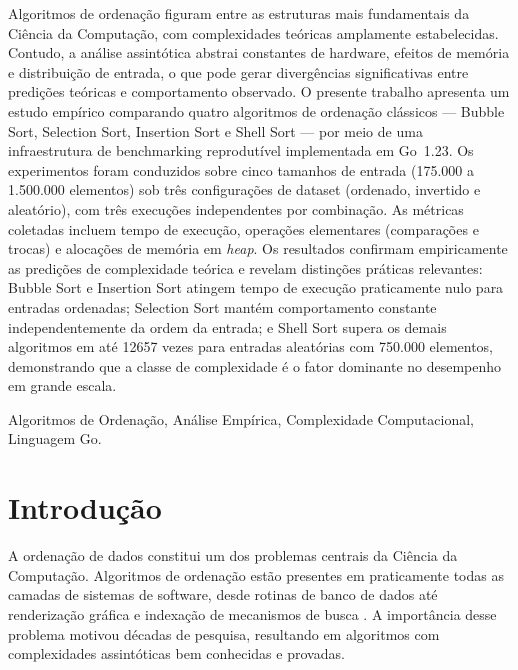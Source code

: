 \documentclass[12pt]{article}
\newcommand{\num}[1]{#1}
\begin{document}
\begin{resumo}
Algoritmos de ordenação figuram entre as estruturas mais
fundamentais da Ciência da Computação, com complexidades teóricas
amplamente estabelecidas. Contudo, a análise assintótica abstrai
constantes de hardware, efeitos de memória e distribuição de
entrada, o que pode gerar divergências significativas entre
predições teóricas e comportamento observado. O presente trabalho
apresenta um estudo empírico comparando quatro algoritmos de
ordenação clássicos — Bubble Sort, Selection Sort, Insertion Sort
e Shell Sort — por meio de uma infraestrutura de benchmarking
reprodutível implementada em Go~1.23. Os experimentos foram
conduzidos sobre cinco tamanhos de entrada (175.000 a 1.500.000
elementos) sob três configurações de dataset (ordenado, invertido
e aleatório), com três execuções independentes por combinação.
As métricas coletadas incluem tempo de execução, operações
elementares (comparações e trocas) e alocações de memória em
\textit{heap}. Os resultados confirmam empiricamente as predições
de complexidade teórica e revelam distinções práticas relevantes:
Bubble Sort e Insertion Sort atingem tempo de execução
praticamente nulo para entradas ordenadas; Selection Sort mantém
comportamento constante independentemente da ordem da entrada; e
Shell Sort supera os demais algoritmos em até \num{12657} vezes
para entradas aleatórias com 750.000 elementos, demonstrando que
a classe de complexidade é o fator dominante no desempenho
em grande escala.

 Algoritmos de Ordenação, Análise Empírica, Complexidade Computacional, Linguagem Go.
\end{resumo}

\section{Introdução}

A ordenação de dados constitui um dos problemas centrais da
Ciência da Computação. Algoritmos de ordenação estão presentes
em praticamente todas as camadas de sistemas de software, desde
rotinas de banco de dados até renderização gráfica e indexação
de mecanismos de busca \cite{cormen2009}. A importância desse
problema motivou décadas de pesquisa, resultando em algoritmos
com complexidades assintóticas bem conhecidas e provadas.
\end{document}

